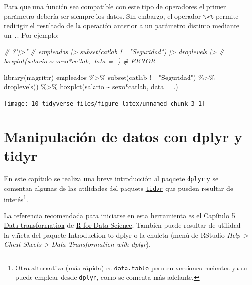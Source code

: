 \documentclass[
]{book}
\newenvironment{Shaded}{\begin{snugshade}}{\end{snugshade}}
\newcommand{\AttributeTok}[1]{\textcolor[rgb]{0.77,0.63,0.00}{#1}}
\newcommand{\CommentTok}[1]{\textcolor[rgb]{0.56,0.35,0.01}{\textit{#1}}}
\newcommand{\FunctionTok}[1]{\textcolor[rgb]{0.00,0.00,0.00}{#1}}
\newcommand{\NormalTok}[1]{#1}
\newcommand{\SpecialCharTok}[1]{\textcolor[rgb]{0.00,0.00,0.00}{#1}}
\newcommand{\StringTok}[1]{\textcolor[rgb]{0.31,0.60,0.02}{#1}}
\theoremstyle{break}
\theoremstyle{nonumberplain}
\begin{document}
Para que una función sea compatible con este tipo de operadores el primer parámetro debería ser siempre los datos.
Sin embargo, el operador \texttt{\%\textgreater{}\%} permite redirigir el resultado de la operación anterior a un parámetro distinto mediante un \texttt{.}.
Por ejemplo:

\begin{Shaded}
\begin{Highlighting}[]
\CommentTok{\# ?"|\textgreater{}"}
\CommentTok{\# empleados |\textgreater{} subset(catlab != "Seguridad") |\textgreater{} droplevels |\textgreater{} }
\CommentTok{\#     boxplot(salario \textasciitilde{} sexo*catlab, data = .) \# ERROR}

\FunctionTok{library}\NormalTok{(magrittr)}
\NormalTok{empleados }\SpecialCharTok{\%\textgreater{}\%} \FunctionTok{subset}\NormalTok{(catlab }\SpecialCharTok{!=} \StringTok{"Seguridad"}\NormalTok{) }\SpecialCharTok{\%\textgreater{}\%} \FunctionTok{droplevels}\NormalTok{() }\SpecialCharTok{\%\textgreater{}\%}
    \FunctionTok{boxplot}\NormalTok{(salario }\SpecialCharTok{\textasciitilde{}}\NormalTok{ sexo}\SpecialCharTok{*}\NormalTok{catlab, }\AttributeTok{data =}\NormalTok{ .)}
\end{Highlighting}
\end{Shaded}

\begin{center}\texttt{[image: 10\_tidyverse\_files/figure-latex/unnamed-chunk-3-1]} \end{center}

\hypertarget{dplyr}{%
\chapter{Manipulación de datos con dplyr y tidyr}\label{dplyr}}

En este capítulo se realiza una breve introducción al paquete \href{https://dplyr.tidyverse.org}{\texttt{dplyr}} y se comentan algunas de las utilidades del paquete \href{https://tidyr.tidyverse.org}{\texttt{tidyr}} que pueden resultar de interés\footnote{Otra alternativa (más rápida) es \href{https://rdatatable.gitlab.io/data.table}{\texttt{data.table}} pero en versiones recientes ya se puede emplear desde \texttt{dplyr}, como se comenta más adelante.}.

La referencia recomendada para iniciarse en esta herramienta es el Capítulo \href{http://r4ds.had.co.nz/transform.html}{5 Data transformation} de
\href{http://r4ds.had.co.nz}{R for Data Science}.
También puede resultar de utilidad la viñeta del paquete \href{https://dplyr.tidyverse.org/articles/dplyr.html}{Introduction to dplyr} o la \href{https://posit.co/wp-content/uploads/2022/10/data-transformation-1.pdf}{chuleta} (menú de RStudio \emph{Help \textgreater{} Cheat Sheets \textgreater{} Data Transformation with dplyr}).
\end{document}

